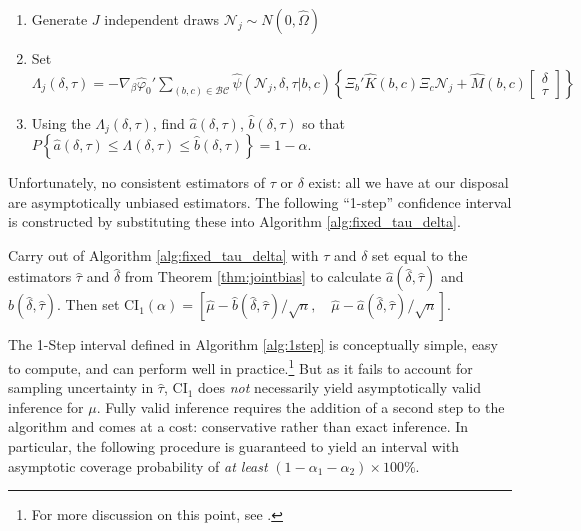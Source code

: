 \begin{alg}
\mbox{}
		\begin{enumerate}
    \item Generate $J$ independent draws $\mathscr{N}_j \sim N(0, \widehat{\Omega})$
			\item Set $\Lambda_j(\delta, \tau)= -\nabla_\beta\widehat{\varphi}_0' \sum_{(b,c) \in \mathcal{BC}} \widehat{\psi}(\mathscr{N}_j,\delta, \tau|b,c) \left\{\Xi_b' \widehat{K}(b,c) \Xi_c \mathscr{N}_j + \widehat{M}(b,c)  \left[\begin{array}{c}\delta \\ \tau \end{array} \right]\right\}$
			\item Using the $\Lambda_j(\delta, \tau)$, find $\widehat{a}(\delta,\tau)$, $\widehat{b}(\delta, \tau)$ so that
		$P\left\{ \widehat{a}(\delta,\tau) \leq\Lambda(\delta,\tau)\leq \widehat{b}(\delta,\tau) \right\} = 1 - \alpha$.
		\end{enumerate}
    \label{alg:fixed_tau_delta}
\end{alg}

Unfortunately, no consistent estimators of $\tau$ or $\delta$ exist: all we have at our disposal are asymptotically unbiased estimators.
The following ``1-step'' confidence interval is constructed by substituting these into Algorithm \ref{alg:fixed_tau_delta}.

\begin{alg} 
  \label{alg:1step}
  Carry out of Algorithm \ref{alg:fixed_tau_delta} with $\tau$ and $\delta$ set equal to the estimators $\widehat{\tau}$ and $\widehat{\delta}$ from Theorem \ref{thm:jointbias} to calculate $\widehat{a}(\widehat{\delta}, \widehat{\tau})$ and $\widehat{b}(\widehat{\delta}, \widehat{\tau})$.
  Then set $\mbox{CI}_{1}(\alpha) = \left[ \widehat{\mu} - \widehat{b}(\widehat{\delta}, \widehat{\tau})/\sqrt{n}, \quad \widehat{\mu} - \widehat{a}(\widehat{\delta}, \widehat{\tau})/\sqrt{n} \right]$.
\end{alg}

The 1-Step interval defined in Algorithm \ref{alg:1step} is conceptually simple, easy to compute, and can perform well in practice.\footnote{For more discussion on this point, see \cite{DiTraglia2016}.}
But as it fails to account for sampling uncertainty in $\widehat{\tau}$, $\mbox{CI}_1$ does \emph{not} necessarily yield asymptotically valid inference for $\mu$.
Fully valid inference requires the addition of a second step to the algorithm and comes at a cost: conservative rather than exact inference.
In particular, the following procedure is guaranteed to yield an interval with asymptotic coverage probability of \emph{at least} $(1- \alpha_1 - \alpha_2)\times 100\%$.

